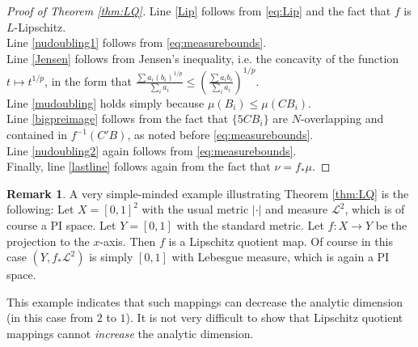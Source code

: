 \documentclass{amsart}
\theoremstyle{plain}
\theoremstyle{definition}
\newtheorem{remark}[theorem]{Remark}
\numberwithin{equation}{section}
\numberwithin{theorem}{section}
\begin{document}
\begin{proof}[Proof of Theorem \ref{thm:LQ}]
Line \eqref{Lip} follows from \eqref{eq:Lip} and the fact that $f$ is $L$-Lipschitz.\\ 
Line \eqref{nudoubling1} follows from \eqref{eq:measurebounds}.\\
Line \eqref{Jensen} follows from Jensen's inequality, i.e. the concavity of the function $t\mapsto t^{1/p}$, in the form that $\frac{\sum a_i (b_i)^{1/p}}{\sum_i a_i} \leq \left(\frac{\sum a_i b_i}{\sum_i a_i}\right)^{1/p} $.\\ 
Line \eqref{mudoubling} holds simply because $\mu(B_i)\leq \mu(CB_i)$.\\ 
Line \eqref{bigpreimage} follows from the fact that $\{5CB_i\}$ are $N$-overlapping and contained in $f^{-1}(C'B)$, as noted before \eqref{eq:measurebounds}.\\ 
Line \eqref{nudoubling2} again follows from \eqref{eq:measurebounds}.\\Finally, line \eqref{lastline} follows again  from the fact that $\nu=f_*\mu$.

\end{proof}


\begin{remark}
A very simple-minded example illustrating Theorem \ref{thm:LQ} is the following: Let $X=[0,1]^2$ with the usual metric $|\cdot|$ and measure $\mathcal{L}^2$, which is of course a PI space. Let $Y=[0,1]$ with the standard metric. Let $f:X\rightarrow Y$ be the projection to the $x$-axis. Then $f$ is a Lipschitz quotient map. Of course in this case $(Y,f_{*}\mathcal{L}^2)$ is simply $[0,1]$ with Lebesgue measure, which is again a PI space.

This example indicates that such mappings can decrease the analytic dimension (in this case from $2$ to $1$). It is not very difficult to show that Lipschitz quotient mappings cannot \textit{increase} the analytic dimension.
\end{remark}





\end{document}
